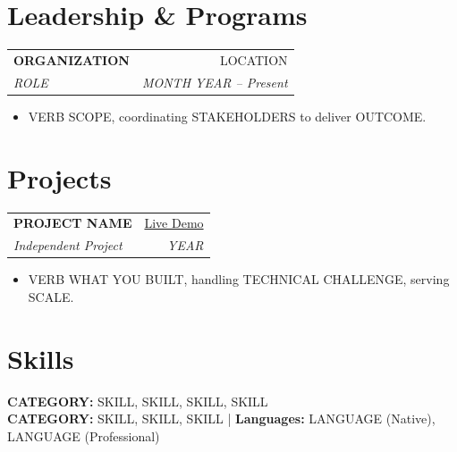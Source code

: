\documentclass[10pt,letterpaper]{extarticle}
\makeatletter
\newcommand{\entry}[4]{%
    \noindent
    \begin{tabular*}{\textwidth}{@{}p{0.70\textwidth}@{\extracolsep{\fill}}r@{}}
        \textbf{#1} & #2 \\
        \textit{#3} & \textit{#4} \\
    \end{tabular*}
    \vspace{1pt} %
}
\makeatother
\begin{document}
\section*{Leadership \& Programs}

\entry{ORGANIZATION}{LOCATION}
      {ROLE}{MONTH YEAR -- Present}
\begin{itemize}
    \item VERB SCOPE, coordinating STAKEHOLDERS to deliver OUTCOME.
\end{itemize}

\section*{Projects}

\entry{PROJECT NAME}{\href{https://EXAMPLE.COM}{Live Demo}}
      {Independent Project}{YEAR}
\begin{itemize}
    \item VERB WHAT YOU BUILT, handling TECHNICAL CHALLENGE, serving SCALE.
\end{itemize}

\section*{Skills}
\noindent\textbf{CATEGORY:} SKILL, SKILL, SKILL, SKILL \\[2pt]
\noindent\textbf{CATEGORY:} SKILL, SKILL, SKILL \quad | \quad \textbf{Languages:} LANGUAGE (Native), LANGUAGE (Professional)
\end{document}
